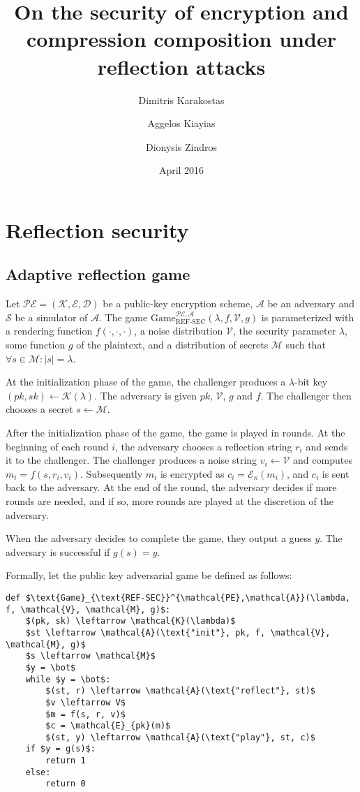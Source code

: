 \documentclass{article}
\title{On the security of encryption and compression composition under reflection attacks}
\author{
Dimitris Karakostas
\and
Aggelos Kiayias
\and
Dionysis Zindros
}
\date{April 2016}
\begin{document}
\maketitle

\section{Reflection security}

\subsection{Adaptive reflection game}

Let $\mathcal{PE} = (\mathcal{K}, \mathcal{E}, \mathcal{D})$ be a public-key
encryption scheme, $\mathcal{A}$ be an adversary and $\mathcal{S}$ be a
simulator of $\mathcal{A}$.  The game
$\text{Game}_{\text{REF-SEC}}^{\mathcal{PE},\mathcal{A}}(\lambda,  f,
\mathcal{V}, g)$ is parameterized with a rendering function $f(\cdot, \cdot,
\cdot)$, a noise distribution $\mathcal{V}$, the security parameter $\lambda$,
some function $g$ of the plaintext, and a distribution of secrets $\mathcal{M}$
such that $\forall s \in \mathcal{M}: |s| = \lambda$.

At the initialization phase of the game, the challenger produces a
$\lambda$-bit key $(pk, sk) \leftarrow \mathcal{K}(\lambda)$. The adversary is
given $pk$, $\mathcal{V}$, $g$ and $f$.  The challenger then chooses a secret
$s \leftarrow \mathcal{M}$.

After the initialization phase of the game, the game is played in rounds. At
the beginning of each round $i$, the adversary chooses a reflection string
$r_i$ and sends it to the challenger. The challenger produces a noise string
$v_i \leftarrow \mathcal{V}$ and computes $m_i = f(s, r_i, v_i)$.  Subsequently
$m_i$ is encrypted as $c_i = \mathcal{E}_\kappa(m_i)$, and $c_i$ is sent back
to the adversary. At the end of the round, the adversary  decides if more
rounds are needed, and if so, more rounds are played at the discretion of the
adversary.

When the adversary decides to complete the game, they output a guess $y$. The
adversary is successful if $g(s) = y$.

Formally, let the public key adversarial game be defined as follows:

\begin{lstlisting}[texcl,mathescape]
def $\text{Game}_{\text{REF-SEC}}^{\mathcal{PE},\mathcal{A}}(\lambda, f, \mathcal{V}, \mathcal{M}, g)$:
    $(pk, sk) \leftarrow \mathcal{K}(\lambda)$
    $st \leftarrow \mathcal{A}(\text{"init"}, pk, f, \mathcal{V}, \mathcal{M}, g)$
    $s \leftarrow \mathcal{M}$
    $y = \bot$
    while $y = \bot$:
        $(st, r) \leftarrow \mathcal{A}(\text{"reflect"}, st)$
        $v \leftarrow V$
        $m = f(s, r, v)$
        $c = \mathcal{E}_{pk}(m)$
        $(st, y) \leftarrow \mathcal{A}(\text{"play"}, st, c)$
    if $y = g(s)$:
        return 1
    else:
        return 0
\end{lstlisting}
\end{document}
